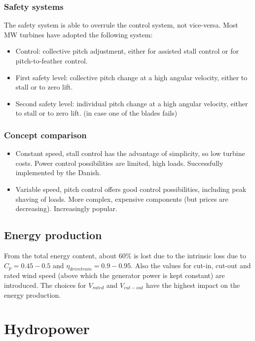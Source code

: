 \documentclass[a4paper,10pt]{article}
\begin{document}
\subsubsection{Safety systems}
The safety system is able to overrule the control system, not vice-versa. Most MW turbines have adopted the following system:
\begin{itemize}
 \item Control: collective pitch adjustment, either for assisted stall control or for pitch-to-feather control.
 \item First safety level: collective pitch change at a high angular velocity, either to stall or to zero lift.
 \item Second safety level: individual pitch change at a high angular velocity, either to stall or to zero lift. (in case one of the blades fails)
\end{itemize}


\subsubsection{Concept comparison}
\begin{itemize}
 \item Constant speed, stall control has the advantage of simplicity, so low turbine costs. Power control possibilities are limited, high loads. Successfully implemented by the Danish.
 \item Variable speed, pitch control offers good control possibilities, including peak shaving of loads. More complex, expensive components (but prices are decreasing). Increasingly popular.
\end{itemize}



\subsection{Energy production}
From the total energy content, about 60\% is lost due to the intrinsic loss due to $C_p = 0.45-0.5$ and $\eta_{drivetrain} = 0.9-0.95$. Also the values for cut-in, cut-out and rated wind speed (above which the generator power is kept constant) are introduced. The choices for $V_{rated}$ and $V_{cut-out}$ have the highest impact on the energy production.



\section{Hydropower}
\end{document}
